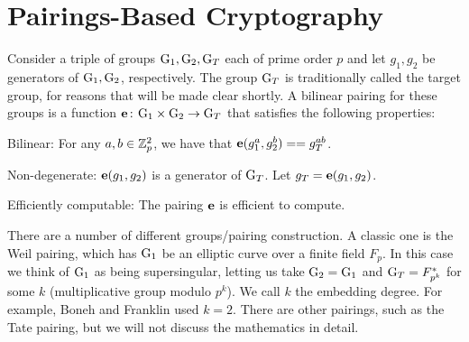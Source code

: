 \section{Pairings-Based Cryptography}
\label{sec:bilinear}

Consider a triple of groups ${{\textnormal G}}_1,{{\textnormal G}}_2,{{\textnormal G}}_T$ each of prime order $p$ and let
$g_1,g_2$
be generators of ${{\textnormal G}}_1,{{\textnormal G}}_2$, respectively. The group
${{\textnormal G}}_T$ is traditionally called the target
group, for reasons that will be made clear shortly. A bilinear pairing for these
groups is a function $\textbf{e}{{\kern .05em}\colon{\kern .05em}}{{\textnormal G}}_1\times{{\textnormal G}}_2\rightarrow{{\textnormal G}}_T$ that satisfies
the following properties:
\begin{newitemize}
\item Bilinear: For any $a,b \in {{\mathbb Z}}_p^2$, we have that
$\textbf{e}(g_1^a,g_2^b) = = g_T^{ab}$. 
%
\item Non-degenerate: $\textbf{e}(g_1,g_2)$ is a generator of ${{\textnormal G}}_T$. Let $g_T =
\textbf{e}(g_1,g_2)$.
%
\item Efficiently computable: The pairing $\textbf{e}$ is efficient to compute.
\end{newitemize}

There are a number of different groups/pairing construction. A classic one is
the Weil pairing, which has ${{\textnormal G}}_1$ be an elliptic curve over a finite field
$F_p$. In this case we think of ${{\textnormal G}}_1$ as being supersingular, letting us take
${{\textnormal G}}_2 = {{\textnormal G}}_1$ and ${{\textnormal G}}_T = F_{p^k}^*$ for some $k$ (multiplicative group modulo
$p^k$). We call $k$ the embedding degree. For example, Boneh and Franklin used
$k = 2$. There are other pairings, such as the Tate pairing, but we will not
discuss the mathematics in detail. 




